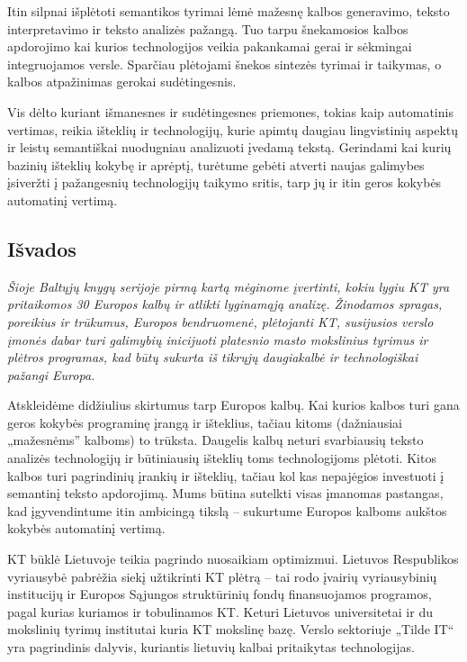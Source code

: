 \begin{multicols}{2}
  Itin silpnai išplėtoti semantikos tyrimai lėmė mažesnę kalbos generavimo, teksto interpretavimo ir teksto analizės pažangą. Tuo tarpu šnekamosios kalbos apdorojimo kai kurios technologijos veikia pakankamai gerai ir sėkmingai integruojamos versle. Sparčiau plėtojami šnekos sintezės tyrimai ir taikymas, o kalbos atpažinimas gerokai sudėtingesnis.   

    Vis dėlto kuriant išmanesnes ir sudėtingesnes priemones, tokias kaip automatinis vertimas, reikia išteklių ir technologijų, kurie apimtų daugiau lingvistinių aspektų ir leistų semantiškai  nuodugniau analizuoti įvedamą tekstą. Gerindami kai kurių bazinių išteklių kokybę ir aprėptį, turėtume gebėti atverti naujas galimybes įsiveržti į pažangesnių technologijų taikymo sritis, tarp jų ir itin geros kokybės automatinį vertimą.

\subsection{Išvados}

\textit{Šioje Baltųjų knygų serijoje pirmą kartą mėginome įvertinti, kokiu lygiu KT yra pritaikomos 30 Europos kalbų ir atlikti lyginamąją analizę. Žinodamos spragas, poreikius ir trūkumus, Europos bendruomenė, plėtojanti KT, susijusios verslo įmonės dabar turi galimybių inicijuoti platesnio masto mokslinius tyrimus ir plėtros programas, kad būtų sukurta iš tikrųjų daugiakalbė ir technologiškai pažangi Europa.}

Atskleidėme didžiulius skirtumus tarp Europos kalbų. Kai kurios kalbos turi gana geros kokybės programinę įrangą ir išteklius, tačiau kitoms (dažniausiai „mažesnėms” kalboms) to trūksta. Daugelis kalbų neturi svarbiausių teksto analizės technologijų ir būtiniausių išteklių toms technologijoms plėtoti. Kitos kalbos turi pagrindinių įrankių ir išteklių, tačiau kol kas nepajėgios investuoti į semantinį teksto apdorojimą. Mums būtina sutelkti visas įmanomas pastangas, kad įgyvendintume itin ambicingą tikslą – sukurtume Europos kalboms aukštos kokybės automatinį vertimą.   

    KT būklė Lietuvoje teikia pagrindo nuosaikiam optimizmui. Lietuvos Respublikos vyriausybė pabrėžia siekį užtikrinti KT plėtrą – tai rodo įvairių vyriausybinių institucijų ir Europos Sąjungos struktūrinių fondų finansuojamos programos, pagal kurias kuriamos ir tobulinamos KT. Keturi Lietuvos universitetai ir du mokslinių tyrimų institutai kuria KT mokslinę bazę. Verslo sektoriuje „Tilde IT“ yra pagrindinis dalyvis, kuriantis lietuvių kalbai pritaikytas technologijas.   


\end{multicols}
